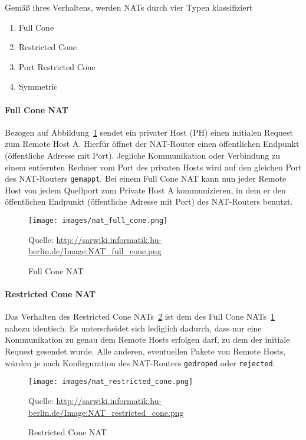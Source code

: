 Gemäß ihres Verhaltens, werden NATs durch vier Typen klassifiziert

\begin{enumerate}
\item Full Cone
\item Restricted Cone
\item Port Restricted Cone
\item Symmetric
\end{enumerate}

\paragraph{Full Cone NAT}

Bezogen auf Abbildung~\ref{fig:nat-full-cone} sendet ein privater Host
(PH) einen initialen Request zum Remote Host A.  Hierfür öffnet der
NAT-Router einen öffentlichen Endpunkt (öffentliche Adresse mit
Port). Jegliche Kommunikation oder Verbindung zu einem entfernten
Rechner vom Port des privaten Hosts wird auf den gleichen Port des
NAT-Routers \texttt{gemappt}. Bei einem Full Cone NAT kann nun jeder
Remote Host von jedem Quellport zum Private Host A kommunizieren, in
dem er den öffentlichen Endpunkt (öffentliche Adresse mit Port) des
NAT-Routers benutzt.

\begin{figure}
  \centering
  \texttt{[image: images/nat\_full\_cone.png]}
  \caption{Full Cone NAT}
  \label{fig:nat-full-cone}  
  \small{Quelle: \url{http://sarwiki.informatik.hu-berlin.de/Image:NAT_full_cone.png}}
\end{figure}

\paragraph{Restricted Cone NAT}

Das Verhalten des Restricted Cone NATs~\ref{fig:nat-restricted-cone}
ist dem des Full Cone NATs~\ref{fig:nat-full-cone} nahezu
identisch. Es unterscheidet sich lediglich dadurch, dass nur eine
Kommunikation zu genau dem Remote Hosts erfolgen darf, zu dem der
initiale Request gesendet wurde.  Alle anderen, eventuellen Pakete von
Remote Hosts, würden je nach Konfirguration des NAT-Routers
\texttt{gedroped} oder \texttt{rejected}.

\begin{figure}
  \centering
  \texttt{[image: images/nat\_restricted\_cone.png]}
  \caption{Restricted Cone NAT}
  \label{fig:nat-restricted-cone}
  \small{Quelle: \url{http://sarwiki.informatik.hu-berlin.de/Image:NAT_restricted_cone.png}}
\end{figure}

